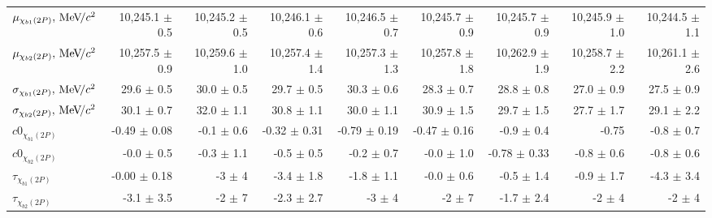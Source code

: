 \begin{table}[H]
{{\begin{tabular}{lrrrrrrrr}
\rule{0pt}{4ex}$\mu_{\chi_{b1}(2P)}, {\mathrm{\,Me\kern -0.1em V\!/}c^2}$ & 10,245.1 $\pm$ 0.5 & 10,245.2 $\pm$ 0.5 & 10,246.1 $\pm$ 0.6 & 10,246.5 $\pm$ 0.7 & 10,245.7 $\pm$ 0.9 & 10,245.7 $\pm$ 0.9 & 10,245.9 $\pm$ 1.0 & 10,244.5 $\pm$ 1.1\\
$\mu_{\chi_{b2}(2P)}, {\mathrm{\,Me\kern -0.1em V\!/}c^2}$ & 10,257.5 $\pm$ 0.9 & 10,259.6 $\pm$ 1.0 & 10,257.4 $\pm$ 1.4 & 10,257.3 $\pm$ 1.3 & 10,257.8 $\pm$ 1.8 & 10,262.9 $\pm$ 1.9 & 10,258.7 $\pm$ 2.2 & 10,261.1 $\pm$ 2.6\\

\rule{0pt}{4ex}$\sigma_{\chi_{b1}(2P)}, {\mathrm{\,Me\kern -0.1em V\!/}c^2}$ & 29.6 $\pm$ 0.5 & 30.0 $\pm$ 0.5 & 29.7 $\pm$ 0.5 & 30.3 $\pm$ 0.6 & 28.3 $\pm$ 0.7 & 28.8 $\pm$ 0.8 & 27.0 $\pm$ 0.9 & 27.5 $\pm$ 0.9\\
$\sigma_{\chi_{b2}(2P)}, {\mathrm{\,Me\kern -0.1em V\!/}c^2}$ & 30.1 $\pm$ 0.7 & 32.0 $\pm$ 1.1 & 30.8 $\pm$ 1.1 & 30.0 $\pm$ 1.1 & 30.9 $\pm$ 1.5 & 29.7 $\pm$ 1.5 & 27.7 $\pm$ 1.7 & 29.1 $\pm$ 2.2\\

\rule{0pt}{4ex}$c0_{\chi_{b1}(2P)}$ & -0.49 $\pm$ 0.08 & -0.1 $\pm$ 0.6 & -0.32 $\pm$ 0.31 & -0.79 $\pm$ 0.19 & -0.47 $\pm$ 0.16 & -0.9 $\pm$ 0.4 & -0.75 & -0.8 $\pm$ 0.7\\
$c0_{\chi_{b2}(2P)}$ & -0.0 $\pm$ 0.5 & -0.3 $\pm$ 1.1 & -0.5 $\pm$ 0.5 & -0.2 $\pm$ 0.7 & -0.0 $\pm$ 1.0 & -0.78 $\pm$ 0.33 & -0.8 $\pm$ 0.6 & -0.8 $\pm$ 0.6\\

\rule{0pt}{4ex}$\tau_{\chi_{b1}(2P)}$ & -0.00 $\pm$ 0.18 & -3 $\pm$ 4 & -3.4 $\pm$ 1.8 & -1.8 $\pm$ 1.1 & -0.0 $\pm$ 0.6 & -0.5 $\pm$ 1.4 & -0.9 $\pm$ 1.7 & -4.3 $\pm$ 3.4\\
$\tau_{\chi_{b2}(2P)}$ & -3.1 $\pm$ 3.5 & -2 $\pm$ 7 & -2.3 $\pm$ 2.7 & -3 $\pm$ 4 & -2 $\pm$ 7 & -1.7 $\pm$ 2.4 & -2 $\pm$ 4 & -2 $\pm$ 4\\
\bottomrule
\end{tabular}
} %

} %
\end{table}
